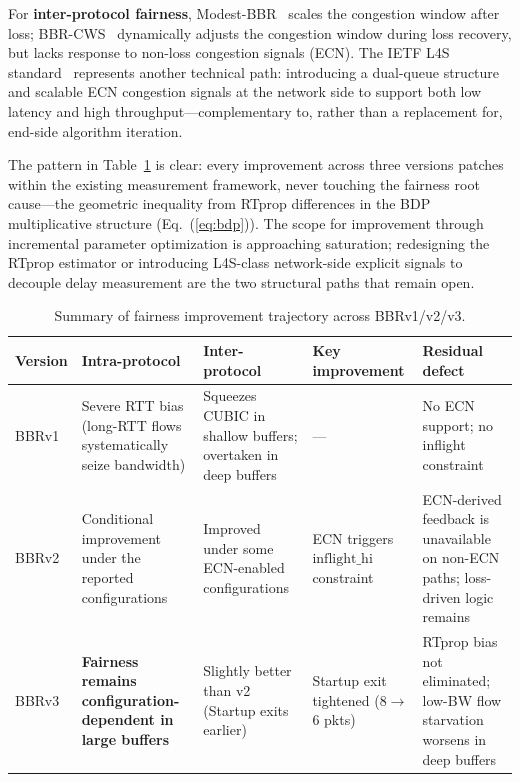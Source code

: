 \documentclass[a4paper,fleqn]{cas-sc}
\begin{document}
For \textbf{inter-protocol fairness}, Modest-BBR~\citep{zhang2018modest} scales
the congestion window after loss; BBR-CWS~\citep{song2020bbrcws} dynamically
adjusts the congestion window during loss recovery, but lacks response to
non-loss congestion signals (ECN). The IETF L4S standard~\citep{rfc9330}
represents another technical path: introducing a dual-queue structure and scalable
ECN congestion signals at the network side to support both low latency and high
throughput---complementary to, rather than a replacement for, end-side algorithm
iteration.

The pattern in Table~\ref{tab:fairness_versions} is clear: every improvement
across three versions patches within the existing measurement framework, never
touching the fairness root cause---the geometric inequality from RTprop differences
in the BDP multiplicative structure (Eq.~(\ref{eq:bdp})). The scope for
improvement through incremental parameter optimization is approaching saturation;
redesigning the RTprop estimator or introducing L4S-class network-side explicit
signals to decouple delay measurement are the two structural paths that remain open.

\begin{table}[pos=htbp]
  \caption{Summary of fairness improvement trajectory across BBRv1/v2/v3.}
  \label{tab:fairness_versions}
  \small
  \begin{tabularx}{\tblwidth}{@{}p{1.0cm}p{2.3cm}p{2.3cm}p{2.0cm}X@{}}
    \toprule
    \textbf{Version} & \textbf{Intra-protocol} & \textbf{Inter-protocol}
      & \textbf{Key improvement} & \textbf{Residual defect} \\
    \midrule
    BBRv1 & Severe RTT bias (long-RTT flows systematically seize bandwidth) &
      Squeezes CUBIC in shallow buffers; overtaken in deep buffers & --- &
      No ECN support; no inflight constraint \\
    \midrule
    BBRv2 & Conditional improvement under the reported configurations &
      Improved under some ECN-enabled configurations &
      ECN triggers $\mathrm{inflight\_hi}$ constraint &
      ECN-derived feedback is unavailable on non-ECN paths; loss-driven logic remains \\
    \midrule
    BBRv3 & \textbf{Fairness remains configuration-dependent in large buffers} &
      Slightly better than v2 (Startup exits earlier) &
      Startup exit tightened (8$\to$6 pkts) &
      RTprop bias not eliminated; low-BW flow starvation worsens in deep buffers \\
    \bottomrule
  \end{tabularx}
\end{table}
\end{document}
